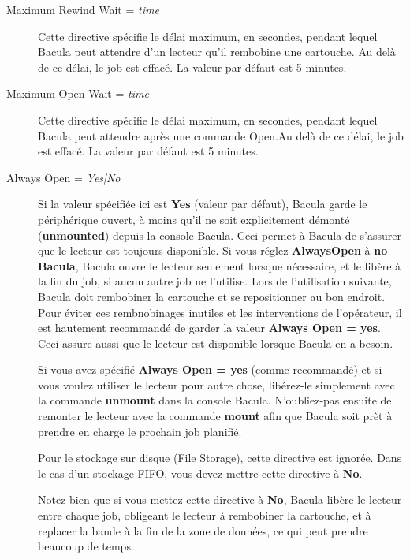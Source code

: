 \begin{description}
\item [Maximum Rewind Wait = {\it time}]
   Cette directive sp\'ecifie le d\'elai maximum, en secondes, pendant lequel Bacula 
   peut attendre d'un lecteur qu'il rembobine une cartouche. Au del\`a de ce d\'elai, 
   le job est effac\'e. La valeur par d\'efaut est 5 minutes.

\item [Maximum Open Wait = {\it time}]
    Cette directive sp\'ecifie le d\'elai maximum, en secondes, pendant lequel Bacula
    peut attendre apr\`es une commande Open.Au del\`a de ce d\'elai,
       le job est effac\'e. La valeur par d\'efaut est 5 minutes.

\item [Always Open = {\it Yes|No}]
   Si la valeur sp\'ecifi\'ee ici est {\bf Yes} (valeur par d\'efaut), Bacula garde le 
   p\'eriph\'erique ouvert, \`a moins qu'il ne soit explicitement d\'emont\'e ({\bf unmounted}) 
   depuis la console Bacula. Ceci permet \`a Bacula de s'assurer que le lecteur est 
   toujours disponible. Si vous r\'eglez  {\bf AlwaysOpen} \`a {\bf no} {\bf Bacula}, 
   Bacula ouvre le lecteur seulement lorsque n\'ecessaire, et le lib\`ere \`a la fin du 
   job, si aucun autre job ne l'utilise. Lors de l'utilisation suivante, Bacula 
   doit rembobiner la cartouche et se repositionner au bon endroit. Pour \'eviter 
   ces rembnobinages inutiles et les interventions de l'op\'erateur, il est 
   hautement recommand\'e de garder la valeur {\bf Always Open = yes}. Ceci assure 
   aussi que le lecteur est disponible lorsque Bacula en a besoin.

  Si vous avez sp\'ecifi\'e {\bf Always Open = yes} (comme recommand\'e) et si vous 
  voulez utiliser le lecteur pour autre chose, lib\'erez-le simplement avec la 
  commande  {\bf unmount} dans la console Bacula. N'oubliez-pas ensuite de 
  remonter le lecteur avec la commande  {\bf mount} afin que Bacula soit pr\`et 
  \`a prendre en charge le prochain job planifi\'e.

  Pour le stockage sur disque (File Storage), cette directive est ignor\'ee. Dans le 
  cas d'un stockage FIFO, vous devez mettre cette directive \`a {\bf No}.
   
  Notez bien que si vous mettez cette directive \`a {\bf No}, Bacula lib\`ere le 
  lecteur entre chaque job, obligeant le lecteur \`a rembobiner la cartouche, et 
  \`a replacer la bande \`a la fin de la zone de donn\'ees, ce qui peut prendre 
  beaucoup de temps.
  

\end{description}
